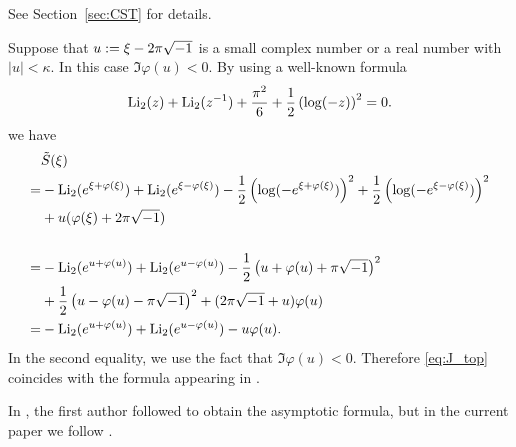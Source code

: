 See Section~\ref{sec:CST} for details.
\begin{rem}
Suppose that $u:=\xi-2\pi\sqrt{-1}$ is a small complex number or a real number with $|u|<\kappa$.
In this case $\Im\varphi(u)<0$.
By using a well-known formula
\begin{equation*}
  \operatorname{Li}_2(z)+\operatorname{Li}_2(z^{-1})+\frac{\pi^2}{6}+\frac{1}{2}\left(\log(-z)\right)^2=0.
\end{equation*}
we have
\begin{equation*}
\begin{split}
  &\tilde{S}(\xi)
  \\
  =&
  -\operatorname{Li}_2(e^{\xi+\varphi(\xi)})+\operatorname{Li}_2(e^{\xi-\varphi(\xi)})
  -\frac{1}{2}\left(\log(-e^{\xi+\varphi(\xi)})\right)^2
  +\frac{1}{2}\left(\log(-e^{\xi-\varphi(\xi)})\right)^2
  \\
  &+u(\varphi(\xi)+2\pi\sqrt{-1})
  \\
  \\
  =&
  -\operatorname{Li}_2(e^{u+\varphi(u)})+\operatorname{Li}_2(e^{u-\varphi(u)})
  -\frac{1}{2}\left(u+\varphi(u)+\pi\sqrt{-1}\right)^2
  \\
  &+\frac{1}{2}\left(u-\varphi(u)-\pi\sqrt{-1}\right)^2
   +(2\pi\sqrt{-1}+u)\varphi(u)
  \\
  =&
  -\operatorname{Li}_2(e^{u+\varphi(u)})+\operatorname{Li}_2(e^{u-\varphi(u)})-u\varphi(u).
\end{split}
\end{equation*}
In the second equality, we use the fact that $\Im\varphi(u)<0$.
Therefore \eqref{eq:J_top} coincides with the formula appearing in \cite[Theorem~1.4]{Murakami:JTOP2013}.
\end{rem}
\begin{rem}
In \cite{Murakami:JTOP2013}, the first author followed \cite{Andersen/Hansen:JKNOT2006} to obtain the asymptotic formula, but in the current paper we follow \cite{Ohtsuki:QT2016}.
\end{rem}